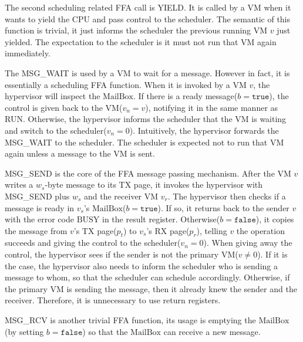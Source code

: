 \documentclass[a4paper]{article}
\newcommand*{\MB}{\text{MailBox}}
\newcommand*{\YIELD}{\text{YIELD}}
\newcommand*{\instr}[1]{\texttt{#1}}
\begin{document}
The second scheduling related FFA call is YIELD. It is called by a VM when it
wants to yield the CPU and pass control to the scheduler. The semantic of this
function is trivial, it just informs the scheduler the previous running VM $v$
just yielded. The expectation to the scheduler is it must not run that VM again
immediately.


The MSG\_WAIT is used by a VM to wait for a message. However in fact, it is
essentially a scheduling FFA function. When it is invoked by a VM $v$, the
hypervisor will inspect the $\MB$. If there is a ready
message($b=\mathtt{true}$), the control is given back to the VM($v_{n}=v$),
notifying it in the same manner as RUN. Otherwise, the hypervisor informs the
scheduler that the VM is waiting and switch to the scheduler($v_{n}=0$).
Intuitively, the hypervisor forwards the MSG\_WAIT to the scheduler. The scheduler
is expected not to run that VM again unless a message to the VM is sent.

MSG\_SEND is the core of the FFA message passing mechanism. After the VM $v$
writes a $w_{s}$-byte message to its TX page, it invokes the hypervisor with
MSG\_SEND plus $w_{s}$ and the receiver VM $v_{r}$. The hypervisor then checks
if a message is ready in $v_{s}$'s $\MB$($b=\mathtt{true}$). If so, it returns
back to the sender $v$ with the error code $\text{BUSY}$ in the result register.
Otherwise($b=\mathtt{false}$), it copies the message from $v$'s TX page($p_{t}$)
to $v_{s}$'s RX page($p_{r}$), telling $v$ the operation succeeds and giving the
control to the scheduler($v_{n}=0$). When giving away the control, the hypervisor
sees if the sender is not the primary VM($v\neq 0$). If it is the case, the
hypervisor also needs to inform the scheduler who is sending a message to whom,
so that the scheduler can schedule accordingly. Otherwise, if the primary VM is
sending the message, then it already knew the sender and the receiver.
Therefore, it is unnecessary to use return registers.

MSG\_RCV is another trivial FFA function, its usage is emptying the $\MB$(by
setting $b=\mathtt{false}$) so that the $\MB$ can receive a new message.

\end{document}
